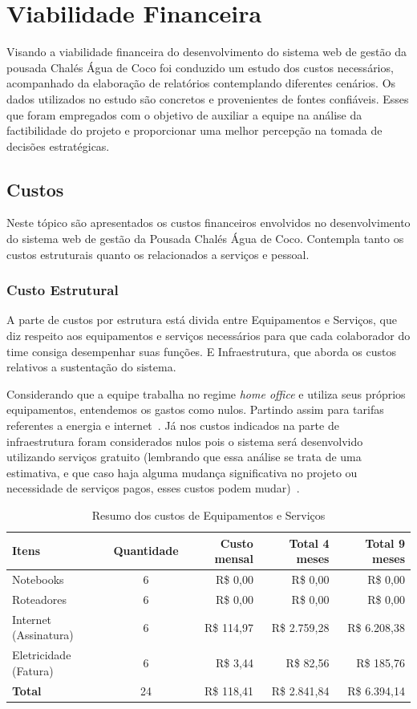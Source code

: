 \documentclass[
	12pt,				%
	openany,			%
	oneside,			%
	a4paper,			%
	english,			%
	french,				%
	spanish,			%
	brazil				%
	]{abntex2}
\begin{document}
\chapter{Viabilidade Financeira}
Visando a viabilidade financeira do desenvolvimento do sistema web de gestão da pousada Chalés Água de Coco foi conduzido um estudo dos custos necessários, acompanhado da elaboração de relatórios contemplando diferentes cenários. Os dados utilizados no estudo são concretos e provenientes de fontes confiáveis. Esses que foram empregados com o objetivo de auxiliar a equipe na análise da factibilidade do projeto e proporcionar uma melhor percepção na tomada de decisões estratégicas.

\section{Custos} Neste tópico são apresentados os custos financeiros envolvidos no desenvolvimento do sistema web de gestão da Pousada Chalés Água de Coco. Contempla tanto os custos estruturais quanto os relacionados a serviços e pessoal.

\subsection{Custo Estrutural}
A parte de custos por estrutura está divida entre Equipamentos e Serviços, que diz respeito aos equipamentos e serviços necessários para que cada colaborador do time consiga desempenhar suas funções. E Infraestrutura, que aborda os custos relativos a sustentação do sistema.

Considerando que a equipe trabalha no regime \textit{home office} e utiliza seus próprios equipamentos, entendemos os gastos como nulos. Partindo assim para tarifas referentes a energia e internet~\cite{anatel-anexo}.
Já nos custos indicados na parte de infraestrutura foram considerados nulos pois o sistema será desenvolvido utilizando serviços gratuito (lembrando que essa análise se trata de uma estimativa, e que caso haja alguma mudança significativa no projeto ou necessidade de serviços pagos, esses custos podem mudar)~\cite{enel-tarifa}.

\begin{table}[H]
	\centering
	\caption{Resumo dos custos de Equipamentos e Serviços}
	\label{tab:equipamentos-servicos}
	\begin{tabular}{|l|c|r|r|r|}
		\hline
		\textbf{Itens} & \textbf{Quantidade} & \textbf{Custo mensal} & \textbf{Total 4 meses} & \textbf{Total 9 meses} \\
		\hline
		Notebooks & 6 & R\$ 0,00 & R\$ 0,00 & R\$ 0,00 \\
		\hline
		Roteadores & 6 & R\$ 0,00 & R\$ 0,00 & R\$ 0,00 \\
		\hline
		Internet (Assinatura) & 6 & R\$ 114,97 & R\$ 2.759,28 & R\$ 6.208,38 \\
		\hline
		Eletricidade (Fatura) & 6 & R\$ 3,44 & R\$ 82,56 & R\$ 185,76 \\
		\hline
		\textbf{Total} & 24 & R\$ 118,41 & R\$ 2.841,84 & R\$ 6.394,14 \\
		\hline
	\end{tabular}
\end{table}
\end{document}
